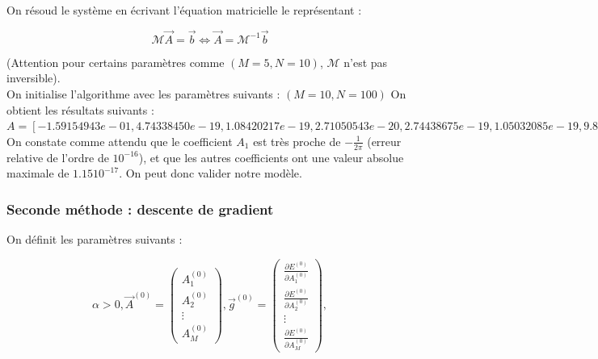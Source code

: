 \documentclass{article}
\begin{document}
On résoud le système en écrivant l'équation matricielle le représentant :

\begin{equation}
    \mathcal{M} \Vec{A} = \Vec{b} \Leftrightarrow \Vec{A} = \mathcal{M}^{-1}\Vec{b} 
\label{eq:équation matricielle}
\end{equation}

(Attention pour  certains paramètres comme $(M=5, N=10)$, $\mathcal{M}$ n'est pas inversible). \\

On initialise l'algorithme avec les paramètres suivants :
$(M=10, N=100)$
On obtient les résultats suivants : \\
$A = [-1.59154943e-01,  4.74338450e-19,  1.08420217e-19,  2.71050543e-20,
2.74438675e-19,  1.05032085e-19,  9.82558219e-20,  5.92923063e-20,
5.42101086e-20,  5.42101086e-20]$ \\
On constate comme attendu que le coefficient $A_1$ est très proche de $-\frac{1}{2\pi}$ (erreur relative de l'ordre de $10^{-16}$), et que les autres coefficients ont une valeur absolue maximale de $1.15 10^{-17}$.
On peut donc valider notre modèle.


\subsubsection{Seconde méthode : descente de gradient}

On définit les paramètres suivants :

\begin{equation}
    \alpha>0, 
    \Vec{A}^{(0)} = \begin{pmatrix}
                A_1^{(0)} \\
                A_2^{(0)} \\
                \vdots \\
                A_M^{(0)}
              \end{pmatrix},
    \Vec{g}^{(0)} = \begin{pmatrix}
                \frac{\partial E^{(0)}}{\partial A_1^{(0)}} \\
                \frac{\partial E^{(0)}}{\partial A_2^{(0)}} \\
                \vdots \\
                \frac{\partial E^{(0)}}{\partial A_M^{(0)}}
              \end{pmatrix},     
\label{eq:définition descente de gradients}
\end{equation}
\end{document}
